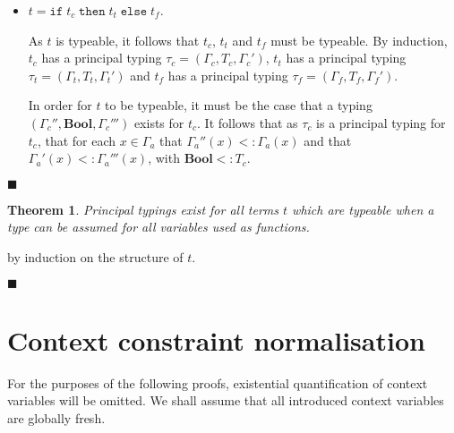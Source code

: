 \documentclass[preprint]{sigplanconf}
\newtheorem{thm}{Theorem}
\newcommand{\boolt}{\mathbf{Bool}}
\newcommand{\ift}[3]{\mathtt{if} \; #1 \; \mathtt{then} \; #2 \; \mathtt{else} \; #3}
\newcommand{\qed}{$\blacksquare$}
\newenvironment{proof}{\vspace{1ex}\noindent{\bf Proof}\hspace{0.5em}}
  {\hfill\qed\vspace{1ex}}
\begin{document}
\begin{proof}
\begin{itemize}

\item $t = \ift{t_c}{t_t}{t_f}$.

As $t$ is typeable, it follows that $t_c$, $t_t$ and $t_f$ must be typeable.
By induction, $t_c$ has a principal typing $\tau_c = (\Gamma_c, T_c, \Gamma_c')$,
$t_t$ has a principal typing $\tau_t = (\Gamma_t, T_t, \Gamma_t')$ and
$t_f$ has a principal typing $\tau_f = (\Gamma_f, T_f, \Gamma_f')$.

In order for $t$ to be typeable, it must be the case that a typing
$(\Gamma_c'', \boolt, \Gamma_c''')$ exists for $t_c$. It follows that as
$\tau_c$ is a principal typing for $t_c$, that for each $x \in \Gamma_a$ that 
$\Gamma_a''(x) <: \Gamma_a(x)$ and that $\Gamma_a'(x) <: \Gamma_a'''(x)$,
with $\boolt <: T_c$.





\end{itemize}
\end{proof}

\begin{thm}
\label{thm:principal}
Principal typings exist for all terms $t$ which
are typeable when a type can be assumed for all variables used as functions.
\end{thm}

\begin{proof}
by induction on the structure of $t$.

\end{proof}


\section{Context constraint normalisation}
\label{app:ctx_norm}

For the purposes of the following proofs, existential quantification of
context variables will be omitted. We shall assume that all introduced
context variables are globally fresh.
\end{document}
